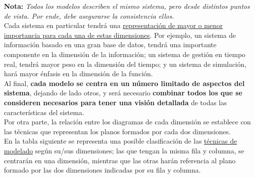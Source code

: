 \textbf{Nota:} \textit{Todos los modelos describen el mismo sistema, pero desde distintos puntos de vista. Por ende, debe asegurarse la consistencia ellos.}\\

Cada sistema en particular tendrá una \uline{representación de mayor o menor importancia para cada una de estas dimensiones}. Por ejemplo, un sistema de información basado en una gran base de datos, tendrá una importante componente en la dimensión de la información; un sistema de gestión en tiempo real, tendrá mayor peso en la dimensión del tiempo; y un sistema de simulación, hará mayor énfasis en la dimensión de la función.\\

Al final, \textbf{cada modelo se centra en un número limitado de aspectos del sistema}, dejando de lado otros, y será necesario \textbf{combinar todos los que se consideren necesarios para tener una visión detallada} de todas las características del sistema.\\

Por otra parte, la relación entre los diagramas de cada dimensión se establece con las técnicas que representan los planos formados por cada dos dimensiones.\\

En la tabla siguiente se representa una posible clasificación de las \uline{técnicas de modelado} según su/sus dimensiones; las que tengan la misma fila y columna, se centrarán en una dimensión, mientras que las otras harán referencia al plano formado por las dos dimensiones indicadas por su fila y columna.

